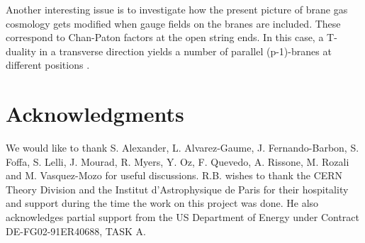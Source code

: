 \documentclass[a4paper,twocolumn,nofootinbib,tightenlines,prd,aps,
               superscriptaddress]{revtex4} %
\begin{document}
Another interesting issue is to investigate how the present
picture of brane gas cosmology gets modified when gauge fields on
the branes are included. These correspond to \coordHE{} Chan-Paton
factors at the open string ends. In this case, a T-duality in a
transverse direction yields a number \coordHE{} of parallel (p-1)-branes
at different positions \cite{Polchinski:1998rq}.




\section*{Acknowledgments}

We would like to thank S. Alexander, L. Alvarez-Gaume, J.
 Fernando-Barbon, S. Foffa, S. Lelli, J. Mourad, R. Myers, Y. Oz, F. Quevedo,
A. Rissone, M. Rozali and M. Vasquez-Mozo  for useful discussions. R.B.
wishes to thank the CERN Theory Division and the Institut
d'Astrophysique de Paris for their hospitality and support during
the time the work on this project was done.  He also acknowledges
partial support from the US Department of Energy under Contract
DE-FG02-91ER40688, TASK A.

\end{document}
